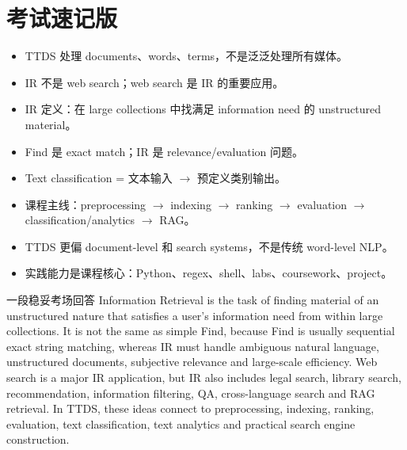 \documentclass[11pt,a4paper]{ctexart}
\begin{document}
\section{考试速记版}
\begin{itemize}
\item TTDS 处理 documents、words、terms，不是泛泛处理所有媒体。
\item IR 不是 web search；web search 是 IR 的重要应用。
\item IR 定义：在 large collections 中找满足 information need 的 unstructured material。
\item Find 是 exact match；IR 是 relevance/evaluation 问题。
\item Text classification = 文本输入 \(\rightarrow\) 预定义类别输出。
\item 课程主线：preprocessing \(\rightarrow\) indexing \(\rightarrow\) ranking \(\rightarrow\) evaluation \(\rightarrow\) classification/analytics \(\rightarrow\) RAG。
\item TTDS 更偏 document-level 和 search systems，不是传统 word-level NLP。
\item 实践能力是课程核心：Python、regex、shell、labs、coursework、project。
\end{itemize}
\begin{callout}{一段稳妥考场回答}
Information Retrieval is the task of finding material of an unstructured nature that satisfies a user's information need from within large collections. It is not the same as simple Find, because Find is usually sequential exact string matching, whereas IR must handle ambiguous natural language, unstructured documents, subjective relevance and large-scale efficiency. Web search is a major IR application, but IR also includes legal search, library search, recommendation, information filtering, QA, cross-language search and RAG retrieval. In TTDS, these ideas connect to preprocessing, indexing, ranking, evaluation, text classification, text analytics and practical search engine construction.
\end{callout}
\end{document}
